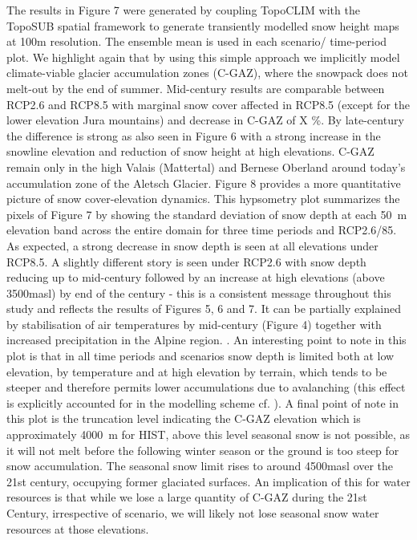\documentclass[hess, manuscript]{copernicus}
\begin{document}
The results in Figure 7 were generated by coupling TopoCLIM with the TopoSUB spatial framework to generate transiently modelled snow height maps at 100m resolution. The ensemble mean is used in each scenario/ time-period plot. We highlight again that by using this simple approach we implicitly model climate-viable glacier accumulation zones (C-GAZ), where the snowpack does not melt-out by the end of summer. Mid-century results are comparable between RCP2.6 and RCP8.5 with marginal snow cover affected in RCP8.5 (except for the lower elevation Jura mountains) and decrease in C-GAZ of X \%. By late-century the difference is strong as also seen in Figure 6 with a strong increase in the snowline elevation and reduction of snow height at high elevations. C-GAZ remain only in the high Valais (Mattertal) and Bernese Oberland around today's accumulation zone of the Aletsch Glacier. Figure 8 provides a more quantitative picture of snow cover-elevation dynamics. This hypsometry plot summarizes the pixels of Figure 7 by showing the standard deviation of snow depth at each 50~m elevation band across the entire domain for three time periods and RCP2.6/85. As expected, a strong decrease in snow depth is seen at all elevations under RCP8.5. A slightly different story is seen under RCP2.6 with snow depth reducing up to mid-century followed by an increase at high elevations (above 3500\unit{masl}) by end of the century - this is a consistent message throughout this study and reflects the results of Figures 5, 6 and 7. It can be partially explained by stabilisation of air temperatures by mid-century (Figure 4) together with increased precipitation in the Alpine region. \citep{Jacob2014-yw, Smiatek2016-lu}. An interesting point to note in this plot is that in all time periods and scenarios snow depth is limited both at low elevation, by temperature and at high elevation by terrain, which tends to be steeper and therefore permits lower accumulations due to avalanching (this effect is explicitly accounted for in the modelling scheme cf. \citet{Fiddes2015-lx}). A final point of note in this plot is the truncation level indicating the C-GAZ elevation which is approximately 4000~m for HIST, above this level seasonal snow is not possible, as it will not melt before the following winter season or the ground is too steep for snow accumulation. The seasonal snow limit rises to around 4500\unit{masl} over the 21st century, occupying former glaciated surfaces. An implication of this for water resources is that while we lose a large quantity of C-GAZ during the 21st Century, irrespective of scenario, we will likely not lose seasonal snow water resources at those elevations.
\end{document}
